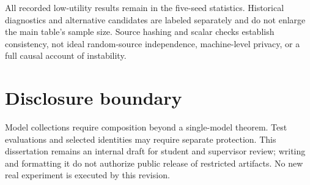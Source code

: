 All recorded low-utility results remain in the five-seed statistics. Historical diagnostics and alternative candidates are labeled separately and do not enlarge the main table's sample size. Source hashing and scalar checks establish consistency, not ideal random-source independence, machine-level privacy, or a full causal account of instability.

\section{Disclosure boundary}
Model collections require composition beyond a single-model theorem. Test evaluations and selected identities may require separate protection. This dissertation remains an internal draft for student and supervisor review; writing and formatting it do not authorize public release of restricted artifacts. No new real experiment is executed by this revision.

